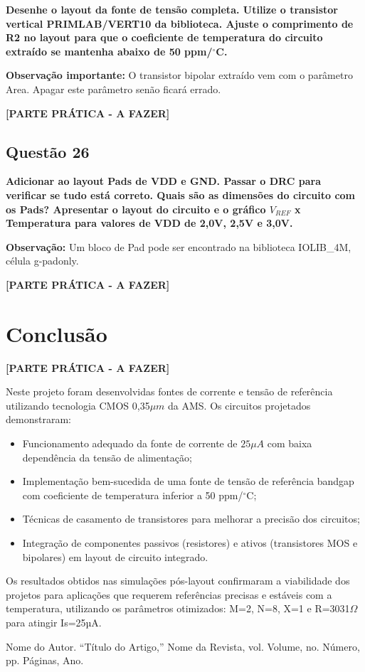 \documentclass[12pt,a4paper]{article}
\newcommand{\degree}{\ensuremath{{}^\circ}}
\begin{document}
\textbf{Desenhe o layout da fonte de tensão completa. Utilize o transistor vertical PRIMLAB/VERT10 da biblioteca. Ajuste o comprimento de R2 no layout para que o coeficiente de temperatura do circuito extraído se mantenha abaixo de 50 ppm/$\degree$C.}

\textbf{Observação importante:} O transistor bipolar extraído vem com o parâmetro Area. Apagar este parâmetro senão ficará errado.

\textbf{[PARTE PRÁTICA - A FAZER]}

\subsection*{Questão 26}

\textbf{Adicionar ao layout Pads de VDD e GND. Passar o DRC para verificar se tudo está correto. Quais são as dimensões do circuito com os Pads? Apresentar o layout do circuito e o gráfico $V_{REF}$ x Temperatura para valores de VDD de 2,0V, 2,5V e 3,0V.}

\textbf{Observação:} Um bloco de Pad pode ser encontrado na biblioteca IOLIB\_4M, célula g-padonly.

\textbf{[PARTE PRÁTICA - A FAZER]}

\section*{Conclusão}

\textbf{[PARTE PRÁTICA - A FAZER]}

Neste projeto foram desenvolvidas fontes de corrente e tensão de referência utilizando tecnologia CMOS 0,35$\mu m$ da AMS. Os circuitos projetados demonstraram:

\begin{itemize}
    \item Funcionamento adequado da fonte de corrente de $25\mu A$ com baixa dependência da tensão de alimentação;
    \item Implementação bem-sucedida de uma fonte de tensão de referência bandgap com coeficiente de temperatura inferior a 50 ppm/$\degree$C;
    \item Técnicas de casamento de transistores para melhorar a precisão dos circuitos;
    \item Integração de componentes passivos (resistores) e ativos (transistores MOS e bipolares) em layout de circuito integrado.
\end{itemize}

Os resultados obtidos nas simulações pós-layout confirmaram a viabilidade dos projetos para aplicações que requerem referências precisas e estáveis com a temperatura, utilizando os parâmetros otimizados: M=2, N=8, X=1 e R=3031$\Omega$ para atingir Is=25µA.

{}
\begin{thebibliography}{99}
     Nome do Autor. ``Título do Artigo,'' Nome da Revista, vol. Volume, no. Número, pp. Páginas, Ano.
\end{thebibliography}
\end{document}
